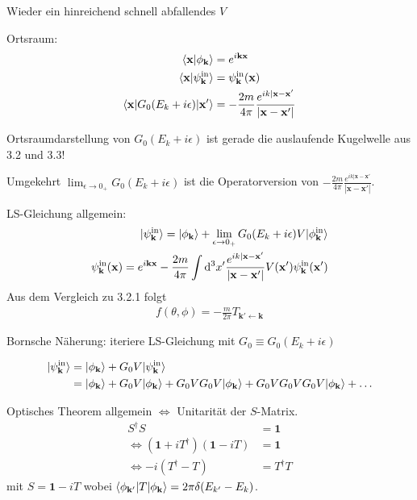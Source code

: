 \documentclass[11pt,a4paper]{report}
\begin{document}
Wieder ein hinreichend schnell abfallendes $V$ 

Ortsraum:
\begin{align*}
    \langle \mathbf{x}|\phi_{\mathbf{k}}\rangle &= e^{i \mathbf{k} \mathbf{x}} \\    
    \langle \mathbf{x}|\psi_{\mathbf{k}}^{\text{in}}\rangle &= \psi_{\mathbf{k}}^{\text{in}}(\mathbf{x}) \\
    \langle \mathbf{x}|G_0(E_k + i \epsilon)|\mathbf{x}'\rangle &= -\frac{2m}{4\pi} \frac{e^{i k |\mathbf{x} - \mathbf{x}'}}{|\mathbf{x} - \mathbf{x}'|}
\end{align*}

Ortsraumdarstellung von $G_0(E_k + i \epsilon)$ ist gerade die auslaufende Kugelwelle aus 3.2 und 3.3!

Umgekehrt $\lim_{\epsilon \rightarrow 0_+} G_0(E_k + i \epsilon)$ ist die Operatorversion von $-\frac{2m}{4\pi} \frac{e^{i k |\mathbf{x} - \mathbf{x}'}}{|\mathbf{x} - \mathbf{x}'|}$.

LS-Gleichung allgemein:
\begin{align*}
    |\psi_{\mathbf{k}}^{\text{in}}\rangle = |\phi_{\mathbf{k}}\rangle + \lim_{\epsilon \rightarrow 0_+} G_0(E_k + i \epsilon) V |\phi_{\mathbf{k}}^{\text{in}}\rangle \\
    \psi_{\mathbf{k}}^{\text{in}}(\mathbf{x}) = e^{i \mathbf{k} \mathbf{x}} - \frac{2m}{4\pi} \int \mathrm{d}^3 x' \frac{e^{i k |\mathbf{x} - \mathbf{x}'}}{|\mathbf{x} - \mathbf{x}'|} V(\mathbf{x}') \psi_{\mathbf{k}}^{\text{in}}(\mathbf{x'})
\end{align*}
Aus dem Vergleich zu 3.2.1 folgt 
\begin{align*}
    f(\theta, \phi) = -\frac{m}{2\pi} T_{\mathbf{k}' \leftarrow \mathbf{k}}
\end{align*}

Bornsche Näherung: iteriere LS-Gleichung mit $G_0 \equiv G_0(E_k + i \epsilon)$

\begin{align*}
    |\psi_{\mathbf{k}}^{\text{in}}\rangle &= |\phi_{\mathbf{k}}\rangle + G_0 V |\psi_{\mathbf{k}}^{\text{in}}\rangle \\ 
    &= |\phi_{\mathbf{k}}\rangle + G_0 V |\phi_{\mathbf{k}}\rangle +  G_0 V G_0 V |\phi_{\mathbf{k}}\rangle + G_0 V G_0 V G_0 V |\phi_{\mathbf{k}}\rangle + \ldots
\end{align*}

Optisches Theorem allgemein $\iff$ Unitarität der $S$-Matrix.
\begin{align*}
    S^\dagger S &= \mathbf{1} \\
    \iff (\mathbf{1} + i T^\dagger) (\mathbf{1} - i T) &= \mathbf{1} \\
    \iff -i (T^\dagger - T) &= T^\dagger T
\end{align*}
mit $S = \mathbf{1} - i T$ wobei $\langle \phi_{\mathbf{k}'}|T|\phi_{\mathbf{k}}\rangle = 2 \pi \delta(E_{k'} - E_k)$.
\end{document}

